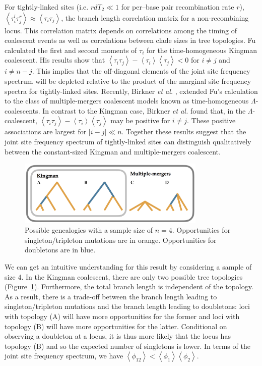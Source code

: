 \documentclass[11pt, letterpaper]{article}   	%
\newcommand{\Fig}[1]{Figure~\ref{#1}}
\newcommand{\E}[1]{\left<{#1}\right>}
\begin{document}
For tightly-linked sites (i.e. $rdT_2\ll1$ for per--base pair recombination rate $r$), $\E{\tau_i^l \tau_j^r} \approx \E{\tau_i \tau_j}$, the branch length correlation matrix for a non-recombining locus.
This correlation matrix depends on correlations among the timing of coalescent events as well as correlations between clade sizes in tree topologies.
Fu \cite{} calculated the first and second moments of $\tau_i$ for the time-homogeneous Kingman coalescent.
His results show that $\E{\tau_i \tau_j} - \E{\tau_i}\E{\tau_j} < 0$ for $i \neq j$ and $i \neq n-j$.
This implies that the off-diagonal elements of the joint site frequency spectrum will be depleted relative to the product of the marginal site frequency spectra for tightly-linked sites.
Recently, Birkner \textit{et al.} \cite{}, extended Fu's calculation to the class of multiple-mergers coalescent models known as time-homogeneous $\Lambda$-coalescents.
In contrast to the Kingman case, Birkner \textit{et al.} found that, in the $\Lambda$-coalescent, $\E{\tau_i \tau_j} - \E{\tau_i}\E{\tau_j}$ may be positive for $i \neq j$.
These positive associations are largest for $|i - j| \ll n$.
Together these results suggest that the joint site frequency spectrum of tightly-linked sites can distinguish qualitatively between the constant-sized Kingman and multiple-mergers coalescent.

\begin{figure}
\centering
\includegraphics[width=0.8\textwidth]{figures/trees.png}
\caption{Possible genealogies with a sample size of $n=4$. Opportunities for singleton/tripleton mutations are in orange. Opportunities for doubletons are in blue.  \label{fig:trees}}
\end{figure}

We can get an intuitive understanding for this result by considering a sample of size 4. In the Kingman coalescent, there are only two possible tree topologies (\Fig{fig:trees}).
Furthermore, the total branch length is independent of the topology.
As a result, there is a trade-off between the branch length leading to singleton/tripleton mutations and the branch length leading to doubletons: loci with topology (A) will have more opportunities for the former and loci with topology (B) will have more opportunities for the latter.
Conditional on observing a doubleton at a locus, it is thus more likely that the locus has topology (B) and so the expected number of singletons is lower.
In terms of the joint site frequency spectrum, we have $\E{\phi_{12}} < \E{\phi_{1}} \E{\phi_{2}}$.
\end{document}
